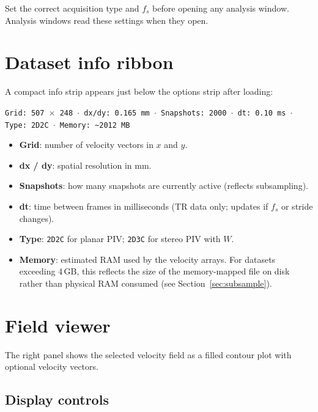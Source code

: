 \documentclass[11pt, a4paper]{report}
\begin{document}
\begin{warnbox}
Set the correct acquisition type and $f_s$ before opening any analysis window. Analysis windows read these settings when they open.
\end{warnbox}

\section{Dataset info ribbon}
\label{sec:datasetinfo}

A compact info strip appears just below the options strip after loading:

\begin{center}
\texttt{Grid: 507\,$\times$\,248 $\cdot$ dx/dy: 0.165\,mm $\cdot$ Snapshots: 2000 $\cdot$ dt: 0.10\,ms $\cdot$ Type: 2D2C $\cdot$ Memory: \textasciitilde{}2012\,MB}
\end{center}

\begin{itemize}[leftmargin=1.5em]
  \item \textbf{Grid}: number of velocity vectors in $x$ and $y$.
  \item \textbf{dx / dy}: spatial resolution in mm.
  \item \textbf{Snapshots}: how many snapshots are currently active (reflects subsampling).
  \item \textbf{dt}: time between frames in milliseconds (TR data only; updates if $f_s$ or stride changes).
  \item \textbf{Type}: \texttt{2D2C} for planar PIV; \texttt{2D3C} for stereo PIV with $W$.
  \item \textbf{Memory}: estimated RAM used by the velocity arrays. For datasets exceeding 4\,GB, this reflects the size of the memory-mapped file on disk rather than physical RAM consumed (see Section~\ref{sec:subsample}).
\end{itemize}

\section{Field viewer}

The right panel shows the selected velocity field as a filled contour plot with optional velocity vectors.

\subsection{Display controls}
\end{document}
